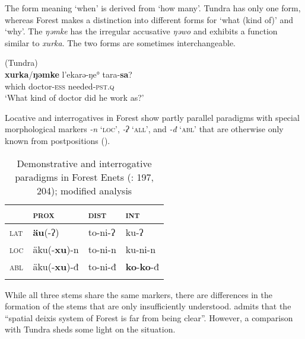 \largerpage
The form meaning ‘when’ is derived from ‘how many’. Tundra  has only one form, whereas Forest  makes a distinction into different forms for ‘what (kind of)’ and ‘why’. The  \textit{ŋəmke} has the irregular accusative  \textit{ŋəwo} \citep[25]{Nikolaeva2014} and exhibits a function similar to \textit{xurka}. The two forms are sometimes interchangeable.

\ea%
    \label{ex:ural:16}
     (Tundra)\\
    \gll \textbf{{xurka}}{/}\textbf{{ŋəmke}} l'ekarə-ŋe° tara-\textbf{{sa}}?\\
    which    doctor-\textsc{ess}  needed-\textsc{pst.q}\\
    \glt ‘What kind of doctor did he work as?’ \citep[261]{Nikolaeva2014}
    \z

Locative  and interrogatives in Forest  show partly parallel par\-a\-digms with special morphological markers \textit{-n} ‘\textsc{loc}’, \textit{-ʔ} ‘\textsc{all}’, and \textit{-}\textit{đ} ‘\textsc{abl}’ that are otherwise only known from postpositions ().

\begin{table}
\caption{Demonstrative and interrogative paradigms in Forest Enets (\citealt{Siegl2013}: 197, 204); modified analysis}
\label{tab:ural:8}

\begin{tabularx}{\textwidth}{XXXl}
\lsptoprule
& \textbf{\textsc{prox}} & \textbf{\textsc{dist}} & \textbf{\textsc{int}}\\
\midrule
\textsc{lat} & \textbf{äu}(-ʔ) & to-ni-ʔ & ku-ʔ\\
\textsc{loc} & äku(-\textbf{xu})-n & to-ni-n & ku-ni-n\\
\textsc{abl} & äku(-\textbf{xu})-đ & to-ni-đ & \textbf{ko}-\textbf{ko}-đ\\
\lspbottomrule
\end{tabularx}
\end{table}

While all three stems share the same  markers, there are differences in the formation of the stems that are only insufficiently understood. \citet[204]{Siegl2013} admits that the “spatial deixis system of Forest  is far from being clear”. However, a comparison with Tundra  sheds some light on the situation.

